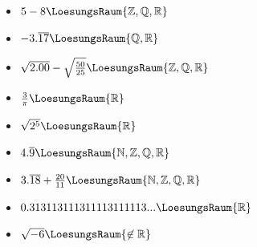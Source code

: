 \begin{itemize}
\item $5-8 \LoesungsRaum{\mathbb{Z,Q,R}}$
\item $-3.\overline{17} \LoesungsRaum{\mathbb{Q,R}}$
\item $\sqrt{2.00} - \sqrt{\frac{50}{25}} \LoesungsRaum{\mathbb{Z,Q,R}}$
\item $\frac{3}{\pi} \LoesungsRaum{\mathbb{R}}$
\item $\sqrt{2^5}\LoesungsRaum{\mathbb{R}}$
\item $4.\overline{9} \LoesungsRaum{\mathbb{N,Z,Q,R}}$
\item $3.\overline{18}+\frac{20}{11} \LoesungsRaum{\mathbb{N,Z,Q,R}}$
\item $0.313113111311113111113... \LoesungsRaum{\mathbb{R}}$
\item $\sqrt{-6} \LoesungsRaum{\not\in\mathbb{R}}$
\end{itemize} 


\TNTeop{}
